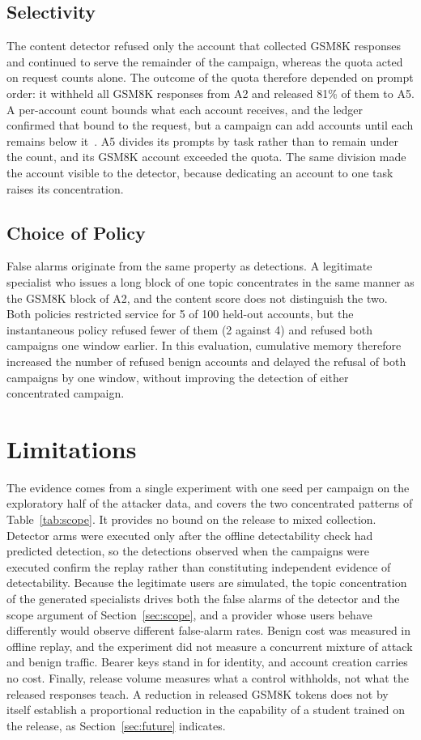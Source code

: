 \documentclass[conference]{IEEEtran}
\begin{document}
\subsection{Selectivity}
The content detector refused only the account that collected GSM8K responses and continued to serve the remainder of the campaign, whereas the quota acted on request counts alone. The outcome of the quota therefore depended on prompt order: it withheld all GSM8K responses from A2 and released 81\% of them to A5. A per-account count bounds what each account receives, and the ledger confirmed that bound to the request, but a campaign can add accounts until each remains below it~\cite{douceur2002sybil}. A5 divides its prompts by task rather than to remain under the count, and its GSM8K account exceeded the quota. The same division made the account visible to the detector, because dedicating an account to one task raises its concentration.

\subsection{Choice of Policy}
False alarms originate from the same property as detections. A legitimate specialist who issues a long block of one topic concentrates in the same manner as the GSM8K block of A2, and the content score does not distinguish the two. Both policies restricted service for 5 of 100 held-out accounts, but the instantaneous policy refused fewer of them (2 against 4) and refused both campaigns one window earlier. In this evaluation, cumulative memory therefore increased the number of refused benign accounts and delayed the refusal of both campaigns by one window, without improving the detection of either concentrated campaign.

\section{Limitations}
\label{sec:limits}
The evidence comes from a single experiment with one seed per campaign on the exploratory half of the attacker data, and covers the two concentrated patterns of Table~\ref{tab:scope}. It provides no bound on the release to mixed collection. Detector arms were executed only after the offline detectability check had predicted detection, so the detections observed when the campaigns were executed confirm the replay rather than constituting independent evidence of detectability. Because the legitimate users are simulated, the topic concentration of the generated specialists drives both the false alarms of the detector and the scope argument of Section~\ref{sec:scope}, and a provider whose users behave differently would observe different false-alarm rates. Benign cost was measured in offline replay, and the experiment did not measure a concurrent mixture of attack and benign traffic. Bearer keys stand in for identity, and account creation carries no cost. Finally, release volume measures what a control withholds, not what the released responses teach. A reduction in released GSM8K tokens does not by itself establish a proportional reduction in the capability of a student trained on the release, as Section~\ref{sec:future} indicates.
\end{document}
